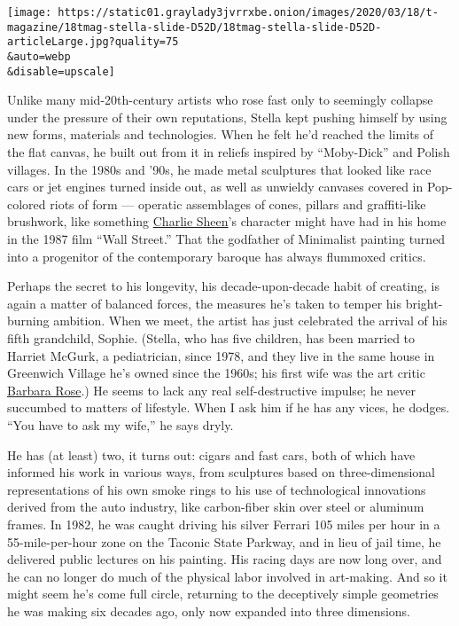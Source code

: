 \texttt{[image: https://static01.graylady3jvrrxbe.onion/images/2020/03/18/t-magazine/18tmag-stella-slide-D52D/18tmag-stella-slide-D52D-articleLarge.jpg?quality=75\\\&auto=webp\\\&disable=upscale]}

Unlike many mid-20th-century artists who rose fast only to seemingly
collapse under the pressure of their own reputations, Stella kept
pushing himself by using new forms, materials and technologies. When he
felt he'd reached the limits of the flat canvas, he built out from it in
reliefs inspired by ``Moby-Dick'' and Polish villages. In the 1980s and
'90s, he made metal sculptures that looked like race cars or jet engines
turned inside out, as well as unwieldy canvases covered in Pop-colored
riots of form --- operatic assemblages of cones, pillars and
graffiti-like brushwork, like something
\href{https://www.nytimes3xbfgragh.onion/topic/person/charlie-sheen}{Charlie
Sheen}'s character might have had in his home in the 1987 film ``Wall
Street.'' That the godfather of Minimalist painting turned into a
progenitor of the contemporary baroque has always flummoxed critics.

Perhaps the secret to his longevity, his decade-upon-decade habit of
creating, is again a matter of balanced forces, the measures he's taken
to temper his bright-burning ambition. When we meet, the artist has just
celebrated the arrival of his fifth grandchild, Sophie. (Stella, who has
five children, has been married to Harriet McGurk, a pediatrician, since
1978, and they live in the same house in Greenwich Village he's owned
since the 1960s; his first wife was the art critic
\href{https://www.thecut.com/2019/04/i-was-married-four-times-once-to-a-famous-artist.html}{Barbara
Rose}.) He seems to lack any real self-destructive impulse; he never
succumbed to matters of lifestyle. When I ask him if he has any vices,
he dodges. ``You have to ask my wife,'' he says dryly.

He has (at least) two, it turns out: cigars and fast cars, both of which
have informed his work in various ways, from sculptures based on
three-dimensional representations of his own smoke rings to his use of
technological innovations derived from the auto industry, like
carbon-fiber skin over steel or aluminum frames. In 1982, he was caught
driving his silver Ferrari 105 miles per hour in a 55-mile-per-hour zone
on the Taconic State Parkway, and in lieu of jail time, he delivered
public lectures on his painting. His racing days are now long over, and
he can no longer do much of the physical labor involved in art-making.
And so it might seem he's come full circle, returning to the deceptively
simple geometries he was making six decades ago, only now expanded into
three dimensions.

